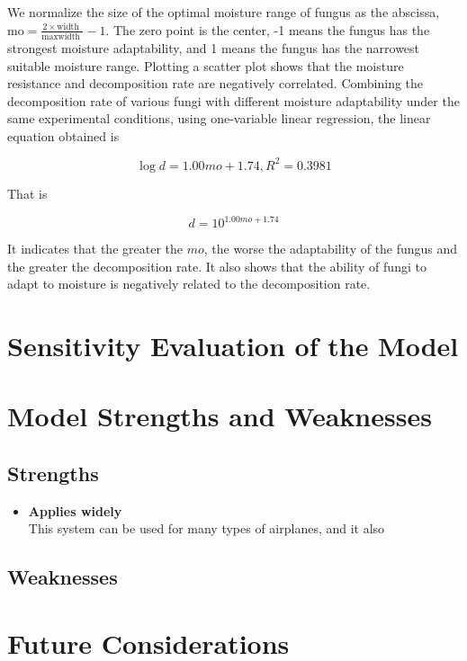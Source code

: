 \documentclass{mcmthesis}
\begin{document}
We normalize the size of the optimal moisture range of fungus as the abscissa, $ \text {mo}=\frac{2 \times \text {width }}{\text {maxwidth }}-1 $. The zero point is the center, -1 means the fungus has the strongest moisture adaptability, and 1 means the fungus has the narrowest suitable moisture range. Plotting a scatter plot shows that the moisture resistance and decomposition rate are negatively correlated. Combining the decomposition rate of various fungi with different moisture adaptability under the same experimental conditions, using one-variable linear regression, the linear equation obtained is 

\begin{equation}
  \log {d}=1.00mo+1.74,R^2=0.3981
\end{equation}

That is

\begin{equation}
  {d}=10 ^{1.00mo+1.74}
\end{equation}

It indicates that the greater the $mo $, the worse the adaptability of the fungus and the greater the decomposition rate. It also shows that the ability of fungi to adapt to moisture is negatively related to the decomposition rate. 


\section{Sensitivity Evaluation of the Model}
\section{Model Strengths and Weaknesses}
\subsection{Strengths}
\begin{itemize}
\item \textbf{Applies widely}\\
This system can be used for many types of airplanes, and it also
\end{itemize}
\subsection{Weaknesses}

\section{Future Considerations}
\end{document}
